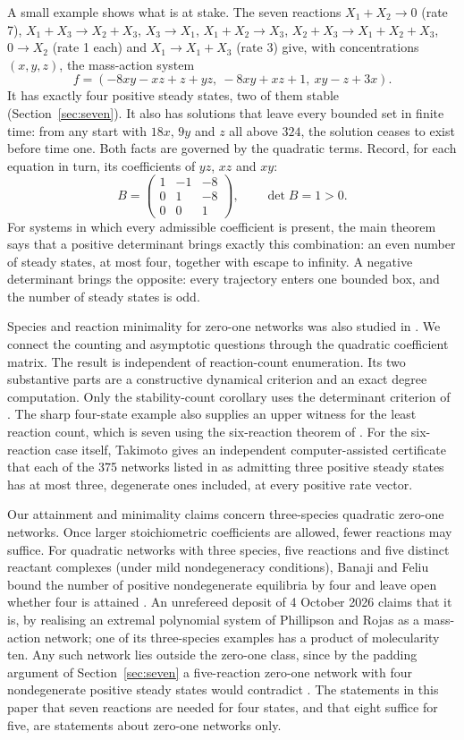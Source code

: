 \documentclass[11pt]{article}
\theoremstyle{remark}\newtheorem{remark}[theorem]{Remark}
\begin{document}
A small example shows what is at stake. The seven reactions
$X_1+X_2\to0$ (rate 7), $X_1+X_3\to X_2+X_3$, $X_3\to X_1$, $X_1+X_2\to X_3$,
$X_2+X_3\to X_1+X_2+X_3$, $0\to X_2$ (rate 1 each) and $X_1\to X_1+X_3$ (rate 3)
give, with concentrations $(x,y,z)$, the mass-action system
\[
 f=(-8xy-xz+z+yz,\ -8xy+xz+1,\ xy-z+3x).
\]
It has exactly four positive steady states, two of them stable
(Section~\ref{sec:seven}). It also has solutions that leave every bounded set in
finite time: from any start with $18x$, $9y$ and $z$ all above $324$, the solution
ceases to exist before time one. Both facts are governed by the quadratic terms.
Record, for each equation in turn, its coefficients of $yz$, $xz$ and $xy$:
\[
 B=\begin{pmatrix}1&-1&-8\\0&1&-8\\0&0&1\end{pmatrix},\qquad \det B=1>0.
\]
For systems in which every admissible coefficient is present, the main theorem
says that a positive determinant brings exactly this combination: an even number
of steady states, at most four, together with escape to infinity. A negative
determinant brings the opposite: every trajectory enters one bounded box, and
the number of steady states is odd.

Species and reaction minimality for zero-one networks was also studied in \cite{JTZ}.
We connect the counting and asymptotic questions through the quadratic coefficient matrix. The
result is independent of reaction-count enumeration. Its two substantive parts
are a constructive dynamical criterion and an exact degree computation.
Only the stability-count corollary uses the determinant criterion of \cite{TZ}.
The sharp four-state example also supplies an upper witness for the least
reaction count, which is seven using the six-reaction theorem of \cite{TZ}.
For the six-reaction case itself, Takimoto \cite{Takimoto} gives an independent
computer-assisted certificate that each of the 375 networks listed in \cite{TZ}
as admitting three positive steady states has at most three, degenerate ones
included, at every positive rate vector.

Our attainment and minimality claims concern three-species quadratic zero-one
networks. Once larger stoichiometric coefficients are allowed, fewer reactions
may suffice. For
quadratic networks with three species, five reactions and five distinct
reactant complexes (under mild nondegeneracy conditions), Banaji and Feliu bound the number of positive nondegenerate
equilibria by four and leave open whether four is attained
\cite[Theorem~5.5 and Remark~5.8]{BF}. An unrefereed deposit of 4 October 2026
\cite{Anon} claims that it is, by realising an extremal polynomial system of
Phillipson and Rojas \cite[Theorem~1.6]{PR} as a mass-action network; one of its three-species
examples has a product of molecularity ten. Any such network lies outside the
zero-one class, since by the padding argument of Section~\ref{sec:seven} a
five-reaction zero-one network with four nondegenerate positive steady states
would contradict \cite[Theorem~2]{TZ}. The statements in this paper that seven reactions are
needed for four states, and that eight suffice for five, are statements about
zero-one networks only.
\end{document}
